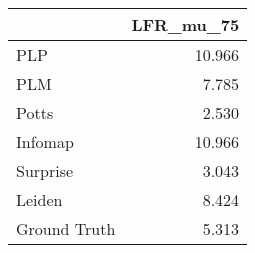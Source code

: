 \begin{tabular}{lr}
\toprule
{} & LFR_mu_75 \\
\midrule
PLP          &    10.966 \\
PLM          &     7.785 \\
Potts        &     2.530 \\
Infomap      &    10.966 \\
Surprise     &     3.043 \\
Leiden       &     8.424 \\
Ground Truth &     5.313 \\
\bottomrule
\end{tabular}
